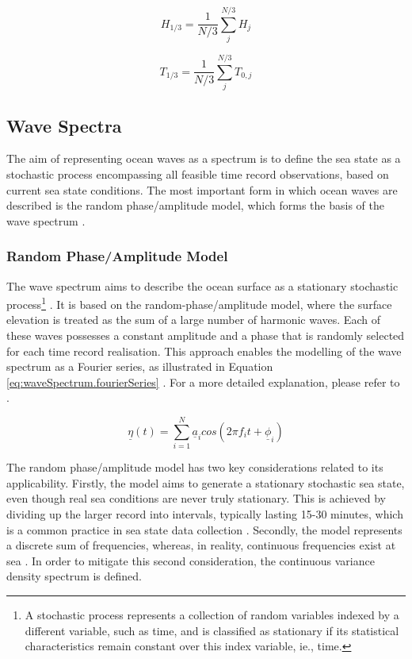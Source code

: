 \begin{equation} \label{eq:waves.sigH}
    H_{1/3} = \frac{1}{N/3}\sum_{j}^{N/3}H_{j}
\end{equation}

\begin{equation} \label{eq:waves.sigT}
    T_{1/3} = \frac{1}{N/3}\sum_{j}^{N/3}T_{0,j}
\end{equation}

\subsection{Wave Spectra} \label{subsec:theory.waves.waveSpectrum}

The aim of representing ocean waves as a spectrum is to define the sea state as a stochastic process encompassing all feasible time record observations, based on current sea state conditions. The most important form in which ocean waves are described is the random phase/amplitude model, which forms the basis of the wave spectrum \cite{Holthuijsen2007}.

\subsubsection{Random Phase/Amplitude Model} \label{subsec:theory.waves.waveSpectrum.randModel}

The wave spectrum aims to describe the ocean surface as a stationary stochastic process\footnote{A stochastic process represents a collection of random variables indexed by a different variable, such as time, and is classified as stationary if its statistical characteristics remain constant over this index variable, ie., time.} \cite{Holthuijsen2007}. It is based on the random-phase/amplitude model, where the surface elevation is treated as the sum of a large number of harmonic waves. Each of these waves possesses a constant amplitude and a phase that is randomly selected for each time record realisation. This approach enables the modelling of the wave spectrum as a Fourier series, as illustrated in Equation \ref{eq:waveSpectrum.fourierSeries} \cite{Holthuijsen2007}. For a more detailed explanation, please refer to \cite{Holthuijsen2007}.

\begin{equation} \label{eq:waveSpectrum.fourierSeries}
    \underline{\eta}(t) = \sum_{i=1}^{N}\underline{a}_{i}cos(2\pi f_{i}t + \underline{\phi}_{i})
\end{equation}

The random phase/amplitude model has two key considerations related to its applicability. Firstly, the model aims to generate a stationary stochastic sea state, even though real sea conditions are never truly stationary. This is achieved by dividing up the larger record into intervals, typically lasting 15-30 minutes, which is a common practice in sea state data collection \cite{Holthuijsen2007}. Secondly, the model represents a discrete sum of frequencies, whereas, in reality, continuous frequencies exist at sea \cite{Holthuijsen2007}. In order to mitigate this second consideration, the continuous variance density spectrum is defined.


